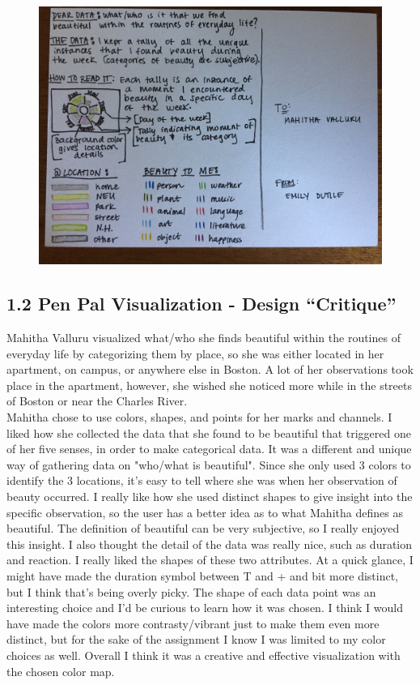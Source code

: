 \documentclass{neu_handout}
\begin{document}
\begin{figure}[h]
\centering
{
\includegraphics[width=0.4\linewidth]{myviz2}
}
\end{figure}

\subsection*{1.2 Pen Pal Visualization - Design “Critique”}

Mahitha Valluru visualized what/who she finds beautiful within the routines of everyday life by categorizing them by place, so she was either located in her apartment, on campus, or anywhere else in Boston. A lot of her observations took place in the apartment, however, she wished she noticed more while in the streets of Boston or near the Charles River.\\

Mahitha chose to use colors, shapes, and points for her marks and channels. I liked how she collected the data that she found to be beautiful that triggered one of her five senses, in order to make categorical data. It was a different and unique way of gathering data on "who/what is beautiful". Since she only used 3 colors to identify the 3 locations, it's easy to tell where she was when her observation of beauty occurred. I really like how she used distinct shapes to give insight into the specific observation, so the user has a better idea as to what Mahitha defines as beautiful. The definition of beautiful can be very subjective, so I really enjoyed this insight. I also thought the detail of the data was really nice, such as duration and reaction. I really liked the shapes of these two attributes. At a quick glance, I might have made the duration symbol between T and + and bit more distinct, but I think that's being overly picky. The shape of each data point was an interesting choice and I'd be curious to learn how it was chosen. I think I would have made the colors more contrasty/vibrant just to make them even more distinct, but for the sake of the assignment I know I was limited to my color choices as well. Overall I think it was a creative and effective visualization with the chosen color map.
\end{document}
